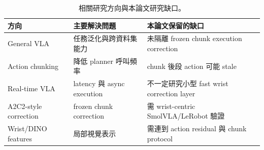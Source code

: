 \begin{table}[htbp]
  \centering
  \caption{相關研究方向與本論文研究缺口。}
  \label{tab:related_gap}
  \begin{tabular}{p{}p{}p{}}
    \toprule
    方向 & 主要解決問題 & 本論文保留的缺口 \\
    \midrule
    General VLA & 任務泛化與跨資料集能力 & 未隔離 frozen chunk execution correction \\
    Action chunking & 降低 planner 呼叫頻率 & chunk 後段 action 可能 stale \\
    Real-time VLA & latency 與 async execution & 不一定研究小型 fast wrist correction layer \\
    A2C2-style correction & frozen chunk correction & 需 wrist-centric SmolVLA/LeRobot 驗證 \\
    Wrist/DINO features & 局部視覺表示 & 需連到 action residual 與 chunk protocol \\
    \bottomrule
  \end{tabular}
\end{table}
